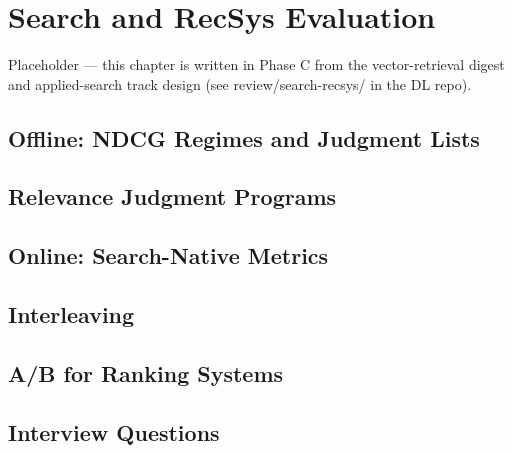 \chapter{Search and RecSys Evaluation}
\label{sr:chap:evaluation_experimentation}

\begin{tldr}
Placeholder — this chapter is written in Phase C from the vector-retrieval digest and applied-search track design (see review/search-recsys/ in the DL repo).
\end{tldr}

\section{Offline: NDCG Regimes and Judgment Lists}

\section{Relevance Judgment Programs}

\section{Online: Search-Native Metrics}

\section{Interleaving}

\section{A/B for Ranking Systems}

\section{Interview Questions}

